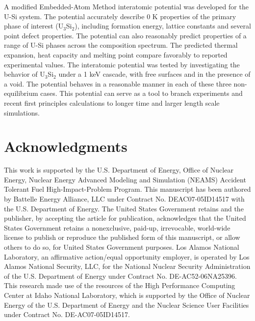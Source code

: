 \documentclass[review]{elsarticle}
\begin{document}
A modified Embedded-Atom Method interatomic potential was developed for the U-Si system.  The potential accurately describe 0 K properties of the primary phase of interest (U$_{3}$Si$_{2}$), including formation energy, lattice constants and several point defect properties.  The potential can also reasonably predict properties of a range of U-Si phases across the composition spectrum.  The predicted thermal expansion, heat capacity and melting point compare favorably to reported experimental values.  The interatomic potential was tested by investigating the behavior of U$_{3}$Si$_{2}$ under a 1 keV cascade, with free surfaces and in the presence of a void.  The potential behaves in a reasonable manner in each of these three non-equilibrium cases.  This potential can serve as a tool to branch experiments and recent first principles calculations to longer time and larger length scale simulations.  

\section{Acknowledgments}
This work is supported by the U.S. Department of Energy, Office of Nuclear Energy, Nuclear Energy Advanced Modeling and Simulation (NEAMS) Accident Tolerant Fuel High-Impact-Problem Program. This manuscript has been authored by Battelle Energy Alliance, LLC under Contract No. DEAC07-05ID14517 with the U.S. Department of Energy. The United States Government retains and the publisher, by accepting the article for publication, acknowledges that the United States Government retains a nonexclusive, paid-up, irrevocable, world-wide license to publish or reproduce the published form of this manuscript, or allow others to do so, for United States Government purposes.  Los Alamos National Laboratory, an affirmative action/equal opportunity employer, is operated by Los Alamos National Security, LLC, for the National Nuclear Security Administration of the U.S. Department of Energy under Contract No. DE-AC52-06NA25396.  This research made use of the resources of the High Performance Computing Center at Idaho National Laboratory, which is supported by the Office of Nuclear Energy of the U.S. Department of Energy and the Nuclear Science User Facilities under Contract No. DE-AC07-05ID14517.
\end{document}
